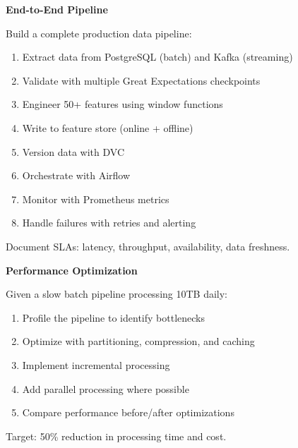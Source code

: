 \begin{exercise}
\textbf{End-to-End Pipeline}

Build a complete production data pipeline:
\begin{enumerate}
    \item Extract data from PostgreSQL (batch) and Kafka (streaming)
    \item Validate with multiple Great Expectations checkpoints
    \item Engineer 50+ features using window functions
    \item Write to feature store (online + offline)
    \item Version data with DVC
    \item Orchestrate with Airflow
    \item Monitor with Prometheus metrics
    \item Handle failures with retries and alerting
\end{enumerate}

Document SLAs: latency, throughput, availability, data freshness.
\end{exercise}

\begin{exercise}
\textbf{Performance Optimization}

Given a slow batch pipeline processing 10TB daily:
\begin{enumerate}
    \item Profile the pipeline to identify bottlenecks
    \item Optimize with partitioning, compression, and caching
    \item Implement incremental processing
    \item Add parallel processing where possible
    \item Compare performance before/after optimizations
\end{enumerate}

Target: 50\% reduction in processing time and cost.
\end{exercise}
